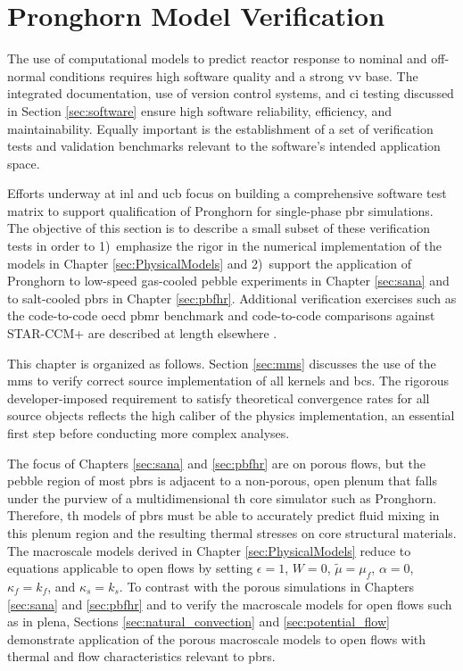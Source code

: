\chapter{Pronghorn Model Verification}
\label{sec:vv}

The use of computational models to predict reactor response to nominal and off-normal conditions requires high software quality and a strong \gls{vv} base. The integrated documentation, use of version control systems, and \gls{ci} testing discussed in Section \ref{sec:software} ensure high software reliability, efficiency, and maintainability. Equally important is the establishment of a set of verification tests and validation benchmarks relevant to the software's intended application space. 

Efforts underway at \gls{inl} and \gls{ucb} focus on building a comprehensive software test matrix to support qualification of Pronghorn for single-phase \gls{pbr} simulations. The objective of this section is to describe a small subset of these verification tests in order to 1)~emphasize the rigor in the numerical implementation of the models in Chapter \ref{sec:PhysicalModels} and 2)~support the application of Pronghorn to low-speed gas-cooled pebble experiments in Chapter \ref{sec:sana} and to salt-cooled \glspl{pbr} in Chapter \ref{sec:pbfhr}. Additional verification exercises such as the code-to-code \gls{oecd} \gls{pbmr} benchmark and code-to-code comparisons against STAR-CCM+ are described at length elsewhere \cite{balestra,lee_2020}.

This chapter is organized as follows. Section \ref{sec:mms} discusses the use of the \gls{mms} to verify correct source implementation of all kernels and \glspl{bc}. The rigorous developer-imposed requirement to satisfy theoretical convergence rates for all source objects reflects the high caliber of the physics implementation, an essential first step before conducting more complex analyses.

The focus of Chapters \ref{sec:sana} and \ref{sec:pbfhr} are on porous flows, but the pebble region of most \glspl{pbr} is adjacent to a non-porous, open plenum that falls under the purview of a multidimensional \gls{th} core simulator such as Pronghorn. Therefore, \gls{th} models of \glspl{pbr} must be able to accurately predict fluid mixing in this plenum region and the resulting thermal stresses on core structural materials. The macroscale models derived in Chapter \ref{sec:PhysicalModels} reduce to equations applicable to open flows by setting \(\epsilon=1\), \(W=0\), \(\tilde{\mu}=\mu_f\), \(\alpha=0\), \(\kappa_f=k_f\), and \(\kappa_s=k_s\). To contrast with the porous simulations in Chapters \ref{sec:sana} and \ref{sec:pbfhr} and to verify the macroscale models for open flows such as in plena, Sections \ref{sec:natural_convection} and \ref{sec:potential_flow} demonstrate application of the porous macroscale models to open flows with thermal and flow characteristics relevant to \glspl{pbr}.

